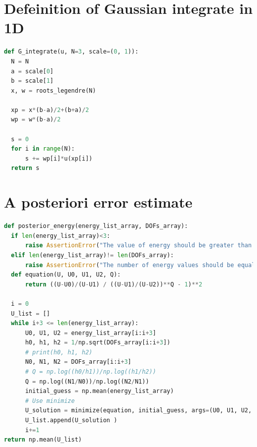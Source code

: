 \documentclass[twoside,twocolumn,10pt]{article}
\begin{document}
\section{Defeinition of Gaussian integrate in 1D}
\label{Apdx:Gaussian-1D}
\begin{lstlisting}[language=Python, caption=Defeinition of Gaussian integrate in 1D]
def G_integrate(u, N=3, scale=(0, 1)):
  N = N  
  a = scale[0] 
  b = scale[1]
  x, w = roots_legendre(N)

  xp = x*(b-a)/2+(b+a)/2
  wp = w*(b-a)/2

  s = 0
  for i in range(N):
      s += wp[i]*u(xp[i])
  return s
\end{lstlisting}
  

\section{A posteriori error estimate}
\label{Apdx:post}
\begin{lstlisting}[language=Python, caption=A posteriori error estimate]
def posterior_energy(energy_list_array, DOFs_array):
  if len(energy_list_array)<3:
      raise AssertionError("The value of energy should be greater than three!")
  elif len(energy_list_array)!= len(DOFs_array):
      raise AssertionError("The number of energy values should be equal to the number of DOFs!")
  def equation(U, U0, U1, U2, Q):
      return ((U-U0)/(U-U1) / ((U-U1)/(U-U2))**Q - 1)**2

  i = 0
  U_list = []
  while i+3 <= len(energy_list_array):
      U0, U1, U2 = energy_list_array[i:i+3]
      h0, h1, h2 = 1/np.sqrt(DOFs_array[i:i+3])
      # print(h0, h1, h2)
      N0, N1, N2 = DOFs_array[i:i+3]
      # Q = np.log((h0/h1))/np.log((h1/h2))
      Q = np.log((N1/N0))/np.log((N2/N1))
      initial_guess = np.mean(energy_list_array)
      # Use minimize
      U_solution = minimize(equation, initial_guess, args=(U0, U1, U2, Q)).x
      U_list.append(U_solution )
      i+=1
return np.mean(U_list)
\end{lstlisting}
  

















 
\end{document}
